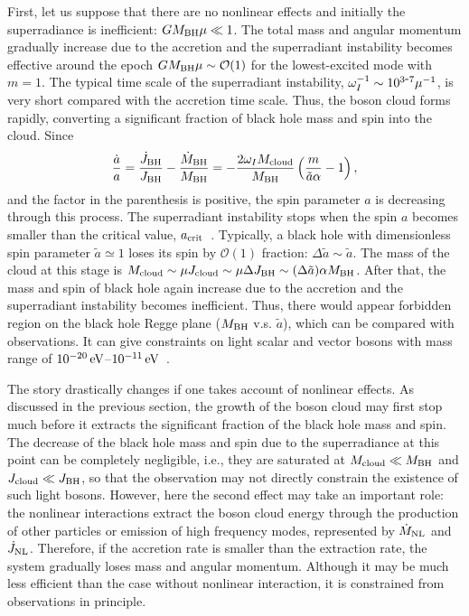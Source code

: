 \documentclass[%
 preprint,
 nofootinbib,
 amsmath,amssymb,
 aps,
 a4paper
]{revtex4-1}
\begin{document}
First, let us suppose that there are no nonlinear effects and initially the superradiance is inefficient: $GM_{\rm BH} \mu\ll 1$. The total mass and angular momentum gradually increase due to the accretion and the superradiant instability becomes effective around the epoch $GM_{\rm BH} \mu\sim \mathcal O(1)$ for the lowest-excited mode with $m = 1$. The typical time scale of the superradiant instability, $\omega_I^{-1} \sim 10^{3\mbox-7} \mu^{-1}$, is very short compared with the accretion time scale. Thus, the boson cloud forms rapidly, converting a significant fraction of black hole mass and spin into the cloud. Since
\begin{align}
	\frac{\dot a}{a} = \frac{\dot J_{\rm BH}}{J_{\rm BH}} - \frac{\dot M_{\rm BH}}{M_{\rm BH}} = -\frac{2\omega_I M_{\rm cloud}}{M_{\rm BH}}\left( \frac{m}{\tilde a\alpha}-1 \right),
\end{align}
and the factor in the parenthesis is positive, the spin parameter $a$ is decreasing through this process. The superradiant instability stops when the spin $a$ becomes smaller than the critical value, $a_{\rm crit}$~\cite{Bekenstein:1973mi,Brito:2014wla,Brito:2015oca}.
Typically, a black hole with dimensionless spin parameter $\tilde a\simeq 1$ loses its spin by $\mathcal O(1)$ fraction: $\Delta \tilde a \sim \tilde a$. The mass of the cloud at this stage is $M_{\rm cloud} \sim \mu J_{\rm cloud} \sim \mu \Delta J_{\rm BH} \sim (\Delta \tilde a)\alpha M_{\rm BH}$.
After that, the mass and spin of black hole again increase due to the accretion and the superradiant instability becomes inefficient.
Thus, there would appear forbidden region on the black hole Regge plane ($M_{\rm BH}$ v.s. $\tilde a$), which can be compared with observations. It can give constraints on light scalar and vector bosons with mass range of $10^{-20}\,{\rm eV}$--$10^{-11}\,{\rm eV}$~\cite{Brito:2014wla,Brito:2015oca}.


The story drastically changes if one takes account of nonlinear effects. As discussed in the previous section, the growth of the boson cloud may first stop much before it extracts the significant fraction of the black hole mass and spin. The decrease of the black hole mass and spin due to the superradiance at this point can be completely negligible, i.e., they are saturated at $M_\text{cloud}\ll M_{\rm BH}$ and $J_\text{cloud} \ll J_{\rm BH}$, so that the observation may not directly constrain the existence of such light bosons. However, here the second effect may take an important role: the nonlinear interactions extract the boson cloud energy through the production of other particles or emission of high frequency modes, represented by $\dot M_{\rm NL}$ and $\dot J_{\rm NL}$. 
Therefore, if the accretion rate is smaller than the extraction rate, the system gradually loses mass and angular momentum. 
Although it may be much less efficient than the case without nonlinear interaction, it is constrained from observations in principle. 
\end{document}
